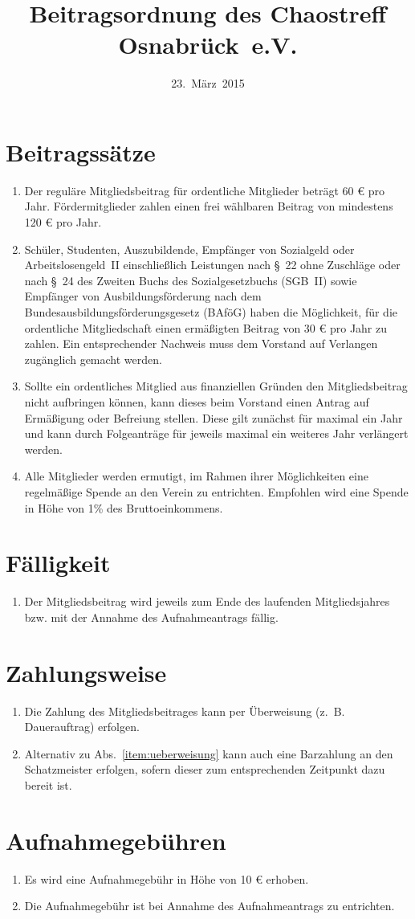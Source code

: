\documentclass[a4paper,12pt]{scrartcl}
\title{Beitragsordnung des Chaostreff Osnabrück~e.V.}
\date{23.~März~2015}
\begin{document}
\maketitle

\section{Beitragssätze}
\begin{enumerate}
  \item Der reguläre Mitgliedsbeitrag für ordentliche Mitglieder beträgt 60 €
    pro Jahr. Fördermitglieder zahlen einen frei wählbaren Beitrag von
    mindestens 120 € pro Jahr.
  \item Schüler, Studenten, Auszubildende, Empfänger von Sozialgeld oder
    Arbeitslosengeld~II einschließlich Leistungen nach §~22 ohne Zuschläge oder
    nach §~24 des Zweiten Buchs des Sozialgesetzbuchs (SGB~II) sowie Empfänger
    von Ausbildungsförderung nach dem Bundesausbildungsförderungsgesetz (BAföG)
    haben die Möglichkeit, für die ordentliche Mitgliedschaft einen ermäßigten
    Beitrag von 30 € pro Jahr zu zahlen. Ein entsprechender Nachweis muss dem
    Vorstand auf Verlangen zugänglich gemacht werden.
  \item Sollte ein ordentliches Mitglied aus finanziellen Gründen den
    Mitgliedsbeitrag nicht aufbringen können, kann dieses beim Vorstand einen
    Antrag auf Ermäßigung oder Befreiung stellen. Diese gilt zunächst für maximal ein
    Jahr und kann durch Folgeanträge für jeweils maximal ein weiteres Jahr verlängert werden.
  \item Alle Mitglieder werden ermutigt, im Rahmen ihrer Möglichkeiten eine
    regelmäßige Spende an den Verein zu entrichten. Empfohlen wird eine Spende
    in Höhe von 1\% des Bruttoeinkommens.
\end{enumerate}

\section{Fälligkeit}
\begin{enumerate}
  \item Der Mitgliedsbeitrag wird jeweils zum Ende des laufenden Mitgliedsjahres bzw. mit der Annahme des Aufnahmeantrags fällig.
\end{enumerate}

\section{Zahlungsweise}
\begin{enumerate}
  \item\label{item:ueberweisung} Die Zahlung des Mitgliedsbeitrages kann per
    Überweisung (z.~B. Dauerauftrag) erfolgen.
  \item Alternativ zu Abs.~\ref{item:ueberweisung} kann auch eine Barzahlung an
    den Schatzmeister erfolgen, sofern dieser zum entsprechenden Zeitpunkt dazu
    bereit ist.
\end{enumerate}

\section{Aufnahmegebühren}
\begin{enumerate}
  \item Es wird eine Aufnahmegebühr in Höhe von 10 € erhoben.
  \item Die Aufnahmegebühr ist bei Annahme des Aufnahmeantrags zu entrichten.
\end{enumerate}
\end{document}
